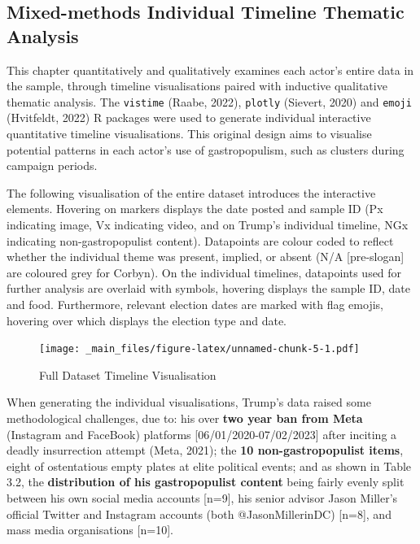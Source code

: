 \documentclass[a4paper, nobind]{templates/ociamthesis}
\begin{document}
\hypertarget{mixed-methods-individual-timeline-thematic-analysis}{%
\subsection*{Mixed-methods Individual Timeline Thematic Analysis}\label{mixed-methods-individual-timeline-thematic-analysis}}

This chapter quantitatively and qualitatively examines each actor's entire data in the sample, through timeline visualisations paired with inductive qualitative thematic analysis. The \texttt{vistime} (Raabe, 2022), \texttt{plotly} (Sievert, 2020) and \texttt{emoji} (Hvitfeldt, 2022) R packages were used to generate individual interactive quantitative timeline visualisations. This original design aims to visualise potential patterns in each actor's use of gastropopulism, such as clusters during campaign periods.

The following visualisation of the entire dataset introduces the interactive elements. Hovering on markers displays the date posted and sample ID (Px indicating image, Vx indicating video, and on Trump's individual timeline, NGx indicating non-gastropopulist content). Datapoints are colour coded to reflect whether the individual theme was present, implied, or absent (N/A {[}pre-slogan{]} are coloured grey for Corbyn). On the individual timelines, datapoints used for further analysis are overlaid with symbols, hovering displays the sample ID, date and food. Furthermore, relevant election dates are marked with flag emojis, hovering over which displays the election type and date.

\begin{figure}
\centering
\texttt{[image: \_main\_files/figure-latex/unnamed-chunk-5-1.pdf]}
\caption{\label{fig:unnamed-chunk-5}Full Dataset Timeline Visualisation}
\end{figure}

When generating the individual visualisations, Trump's data raised some methodological challenges, due to: his over \textbf{two year ban from Meta} (Instagram and FaceBook) platforms {[}06/01/2020-07/02/2023{]} after inciting a deadly insurrection attempt (Meta, 2021); the \textbf{10 non-gastropopulist items}, eight of ostentatious empty plates at elite political events; and as shown in Table 3.2, the \textbf{distribution of his gastropopulist content} being fairly evenly split between his own social media accounts {[}n=9{]}, his senior advisor Jason Miller's official Twitter and Instagram accounts (both @JasonMillerinDC) {[}n=8{]}, and mass media organisations {[}n=10{]}.
\end{document}
